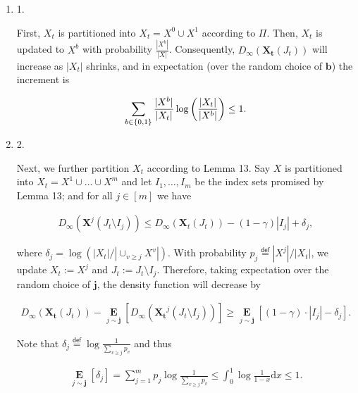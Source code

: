 \documentclass[10pt,a4paper]{article}
\begin{document}
\begin{enumerate}


\item[] 
1. 


First, $X_{t}$ is partitioned into $X_{t}=X^{0}\cup X^{1}$ according to $\Pi$.
Then, $X_{t}$ is updated to $X^{b}$ with probability $\frac{|X^{b}|}{|X|}$.
Consequently, $D_{\infty}(\bm{X_{t}}(J_{t}))$ will increase as $|X_{t}|$ shrinks, and in expectation (over the random choice of $\bm{b}$) the increment is\par


\[\begin{gathered}
\sum_{b\in\left\{0,1\right\}}\frac{|X^{b}|}{|X_{t}|}\log\bigg{(}\frac{|X_{t}|}{|X^{b}|}\bigg{)}\leq 1.
\end{gathered}\]





\item[] 
2. 


Next, we further partition $X_{t}$ according to Lemma 13.
Say $X$ is partitioned into $X_{t}=X^{1}\cup\dots\cup X^{m}$ and let $I_{1},\dots,I_{m}$ be the index sets promised by Lemma 13; and for all $j\in[m]$ we have\par


\[\begin{gathered}
D_{\infty}(\bm{X}^{j}(J_{t}\setminus I_{j}))\leq D_{\infty}(\bm{X}_{t}(J_{t}))-(1-\gamma)|I_{j}|+\delta_{j},
\end{gathered}\]


where $\delta_{j}=\log(|X_{t}|/|\cup_{v\geq j}X^{v}|)$.
With probability $p_{j}\stackrel{{\scriptstyle\mathsf{def}}}{{=}}|X^{j}|/|X_{t}|$, we update $X_{t}:=X^{j}$ and $J_{t}:=J_{t}\setminus I_{j}$.
Therefore, taking expectation over the random choice of $\bm{j}$, the density function will decrease by\par


\[\begin{gathered}
D_{\infty}(\bm{X_{t}}(J_{t}))-\operatorname*{\mathbf{E}}_{j\sim\bm{j}}\left[D_{\infty}(\bm{X_{t}}^{j}(J_{t}\setminus I_{j}))\right]\geq\operatorname*{\mathbf{E}}_{j\sim\bm{j}}\left[(1-\gamma)\cdot|I_{j}|-\delta_{j}\right].
\end{gathered}\]


Note that $\delta_{j}\stackrel{{\scriptstyle\mathsf{def}}}{{=}}\log\frac{1}{\sum_{v\geq j}p_{v}}$ and thus\par


\[\begin{gathered}
\operatorname*{\mathbf{E}}_{j\sim\bm{j}}\left[\delta_{j}\right]=\sum_{j=1}^{m}p_{j}\log\frac{1}{\sum_{v\geq j}p_{v}}\leq\int_{0}^{1}\log\frac{1}{1-x}\mathrm{d}x\leq 1.
\end{gathered}\]





\end{enumerate}
\end{document}
